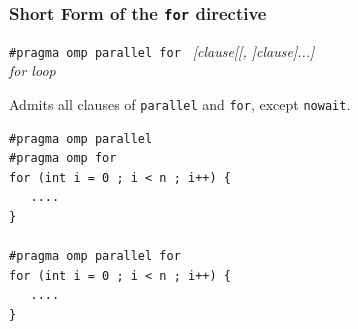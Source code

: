\documentclass{beamer}
\begin{document}



  
  
  


\begin{frame}[fragile=singleslide]
  \frametitle{Short Form of the \texttt{for} directive}
  
\begin{framed}
  {\tt \#pragma omp parallel for } {\it  [clause[[, ]clause]...]}  \\
  {\it for loop} 
\end{framed}

Admits all clauses of {\tt parallel} and {\tt for}, except {\tt nowait}.

\medskip

\begin{verbatim}
#pragma omp parallel
#pragma omp for
for (int i = 0 ; i < n ; i++) {
   ....
}

#pragma omp parallel for
for (int i = 0 ; i < n ; i++) {
   ....
}
\end{verbatim}
\end{frame}
\end{document}
